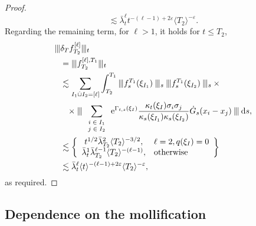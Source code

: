 \documentclass[11pt, a4paper]{scrartcl}
\numberwithin{equation}{section}
\theoremstyle{plain}
\theoremstyle{remark}
\newcommand{\mathd}{\mathrm{d}}
\newcommand{\mathe}{\mathrm{e}}
\newcommand{\tmscript}[1]{\text{\scriptsize{$#1$}}}
\begin{document}
\begin{proof}
\[        \lesssim \bar{\lambda}_t^{\ell} t^{- (\ell - 1) + 2 \varepsilon} \langle T_2
        \rangle^{- \varepsilon} . \]
     Regarding the remaining term, for $\ell > 1$, it holds for $t \leqslant T_2$,
     \begin{equation*}
      \begin{aligned}
        \interleave &\delta_T f_{T_2}^{[\ell]} \interleave_t \\
        &= \interleave
        f_{T_2}^{[\ell], T_1} \interleave_t   \\
        &  \lesssim \sum_{I_1 \dot{\cup} I_2 = [\ell]} \int_{T_2}^{T_1} \interleave
        f_s^{T_1} (\xi_{I_1}) \interleave_s \interleave f_s^{T_1} (\xi_{I_2})
        \interleave_s \times\\ 
      &\phantom{\lesssim}\times\interleave \sum_{\tmscript{\begin{array}{c}
          i \in I_1\\
          j \in I_2
        \end{array}}} \mathe^{\Gamma_{t, s} (\xi_I)} \frac{\kappa_t (\xi_I) \sigma_i
        \sigma_j}{\kappa_s (\xi_{I_1}) \kappa_s (\xi_{I_2})} \dot{G}_s (x_i - x_j)
        \interleave \mathd s,\\ 
        &\lesssim \left\{ \begin{array}{cl}
          t^{1 / 2} \bar{\lambda}_{T_2}^2 \langle T_2 \rangle^{- 3 / 2}, & \ell = 2, q
          (\xi_I) = 0\\
          \bar{\lambda}_t^1 \bar{\lambda}_{T_2}^{\ell - 1} \langle T_2 \rangle^{- (\ell -
          1)}, & \text{otherwise}
        \end{array} \right\} \\
        &\lesssim \bar{\lambda}_t^{\ell} \langle t \rangle^{- (\ell
        - 1) + 2 \varepsilon} \langle T_2 \rangle^{- \varepsilon},
      \end{aligned}
     \end{equation*}
     as required.
   \end{proof}
   
   \subsection{Dependence on the mollification}
   
\end{document}
